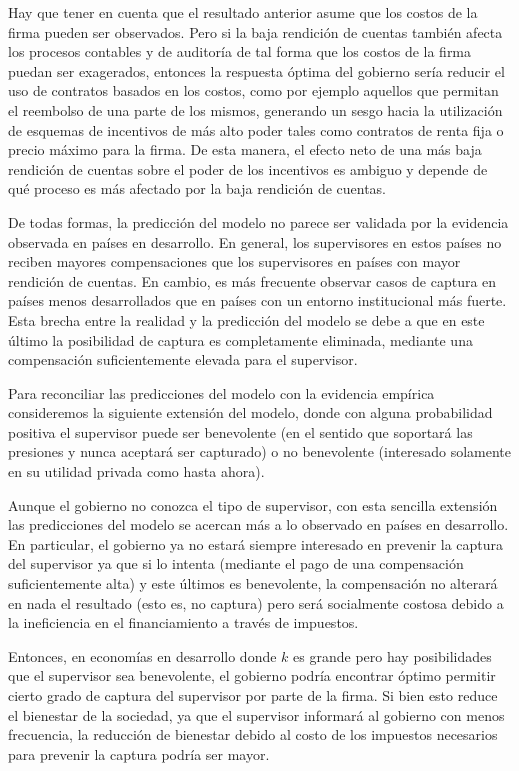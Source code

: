 \documentclass[
  12pt,
  spanish,
]{book}
\begin{document}
Hay que tener en cuenta que el resultado anterior asume que los costos
de la firma pueden ser observados. Pero si la baja rendición de cuentas
también afecta los procesos contables y de auditoría de tal forma que
los costos de la firma puedan ser exagerados, entonces la respuesta
óptima del gobierno sería reducir el uso de contratos basados en los
costos, como por ejemplo aquellos que permitan el reembolso de una parte
de los mismos, generando un sesgo hacia la utilización de esquemas de
incentivos de más alto poder tales como contratos de renta fija o precio
máximo para la firma. De esta manera, el efecto neto de una más baja
rendición de cuentas sobre el poder de los incentivos es ambiguo y
depende de qué proceso es más afectado por la baja rendición de cuentas.

De todas formas, la predicción del modelo no parece ser validada por la
evidencia observada en países en desarrollo. En general, los
supervisores en estos países no reciben mayores compensaciones que los
supervisores en países con mayor rendición de cuentas. En cambio, es más
frecuente observar casos de captura en países menos desarrollados que en
países con un entorno institucional más fuerte. Esta brecha entre la
realidad y la predicción del modelo se debe a que en este último la
posibilidad de captura es completamente eliminada, mediante una
compensación suficientemente elevada para el supervisor.

Para reconciliar las predicciones del modelo con la evidencia empírica
consideremos la siguiente extensión del modelo, donde con alguna
probabilidad positiva el supervisor puede ser benevolente (en el sentido
que soportará las presiones y nunca aceptará ser capturado) o no
benevolente (interesado solamente en su utilidad privada como hasta
ahora).

Aunque el gobierno no conozca el tipo de supervisor, con esta sencilla
extensión las predicciones del modelo se acercan más a lo observado en
países en desarrollo. En particular, el gobierno ya no estará siempre
interesado en prevenir la captura del supervisor ya que si lo intenta
(mediante el pago de una compensación suficientemente alta) y este
últimos es benevolente, la compensación no alterará en nada el resultado
(esto es, no captura) pero será socialmente costosa debido a la
ineficiencia en el financiamiento a través de impuestos.

Entonces, en economías en desarrollo donde \(k\) es grande pero hay
posibilidades que el supervisor sea benevolente, el gobierno podría
encontrar óptimo permitir cierto grado de captura del supervisor por
parte de la firma. Si bien esto reduce el bienestar de la sociedad, ya
que el supervisor informará al gobierno con menos frecuencia, la
reducción de bienestar debido al costo de los impuestos necesarios para
prevenir la captura podría ser mayor.
\end{document}
